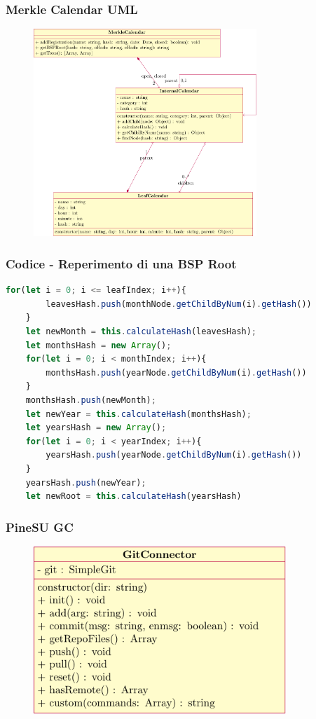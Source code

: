\documentclass{beamer}
\begin{document}
\begin{frame}
	\frametitle{Merkle Calendar UML}
	\begin{figure}
		\includegraphics[width=0.75\textwidth]{figures/umlmc.pdf}
	\end{figure}
\end{frame}

\begin{frame}[fragile]
	\frametitle{Codice - Reperimento di una BSP Root}
	\begin{lstlisting}[language=JavaScript, numbers=none]
	for(let i = 0; i <= leafIndex; i++){
		leavesHash.push(monthNode.getChildByNum(i).getHash())
	}
	let newMonth = this.calculateHash(leavesHash);
	let monthsHash = new Array();
	for(let i = 0; i < monthIndex; i++){
		monthsHash.push(yearNode.getChildByNum(i).getHash())
	}
	monthsHash.push(newMonth);
	let newYear = this.calculateHash(monthsHash);
	let yearsHash = new Array();
	for(let i = 0; i < yearIndex; i++){
		yearsHash.push(yearNode.getChildByNum(i).getHash())
	}
	yearsHash.push(newYear);
	let newRoot = this.calculateHash(yearsHash)
	\end{lstlisting}
\end{frame}

\begin{frame}
	\frametitle{PineSU GC}
	\begin{figure}
		\includegraphics[width=0.85\textwidth]{figures/umlgc.pdf}
	\end{figure}
\end{frame}
\end{document}
